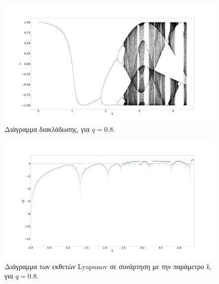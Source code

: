 \begin{figure}[ht]
	\centering
	\includegraphics[width=1\linewidth]{LateX images/cheb q=0.8/g1}
	\caption{Διάγραμμα διακλάδωσης, για $q=0.8$.}
	\label{f:g59}
\end{figure}


\begin{figure}[ht]
	\centering
	\includegraphics[width=1\linewidth]{LateX images/cheb q=0.8/g2}
	\caption{Διάγραμμα των εκθετών Lyapunov σε συνάρτηση με την παράμετρο \emph{k}, για $q=0.8$.}
	\label{f:g60}
\end{figure}


